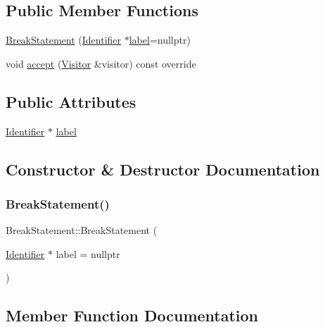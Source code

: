 \subsection*{Public Member Functions}
\begin{DoxyCompactItemize}
\item 
\hyperlink{struct_break_statement_a069ece35d82ad5cde60d51221f3b2d5f}{Break\+Statement} (\hyperlink{struct_identifier}{Identifier} $\ast$\hyperlink{struct_break_statement_a42b738327adc45037878958ebb488113}{label}=nullptr)
\item 
void \hyperlink{struct_break_statement_a915562cfa7dbbcadb0daecc3c3aa7d1f}{accept} (\hyperlink{struct_visitor}{Visitor} \&visitor) const override
\end{DoxyCompactItemize}
\subsection*{Public Attributes}
\begin{DoxyCompactItemize}
\item 
\hyperlink{struct_identifier}{Identifier} $\ast$ \hyperlink{struct_break_statement_a42b738327adc45037878958ebb488113}{label}
\end{DoxyCompactItemize}


\subsection{Constructor \& Destructor Documentation}
\mbox{\label{struct_break_statement_a069ece35d82ad5cde60d51221f3b2d5f}} 
\subsubsection{\texorpdfstring{Break\+Statement()}{BreakStatement()}}
{\footnotesize\ttfamily Break\+Statement\+::\+Break\+Statement (\begin{DoxyParamCaption}\item[{\hyperlink{struct_identifier}{Identifier} $\ast$}]{label = {\ttfamily nullptr} }\end{DoxyParamCaption})\hspace{0.3cm}{\ttfamily [inline]}}



\subsection{Member Function Documentation}
\mbox{\label{struct_break_statement_a915562cfa7dbbcadb0daecc3c3aa7d1f}} 
